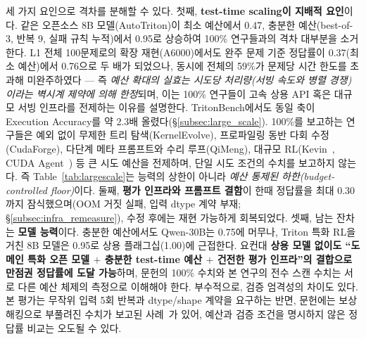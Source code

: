 \documentclass[sigplan,screen,review,anonymous]{acmart}
\begin{document}
\begin{table}[t]
\centering
\caption{동일 파이프라인에서 test-time 예산에 따른 Level~1 정답률. bo$N$=best-of-$N$, it$K$=반복 $K$회. 전수(100문제) 행은 Table~\ref{tab:largescale}, 정밀(P1--P20) 행은 \S\ref{subsec:infra_remeasure}·\S\ref{subsec:large_scale}의 측정이다. $^{\P}$완주한 38문제 기준(정답 29). 나머지 59문제는 문제당 시간 한도(2시간, 27회 시도 $\times$ 저속 서빙) 초과로 미완주 — 예산 확대의 실효가 벽시계 처리량에 의해 제약됨을 보여준다(총 22.9시간 소요).}
\label{tab:budget}
\end{table}

세 가지 요인으로 격차를 분해할 수 있다. 첫째, \textbf{test-time scaling이 지배적 요인}이다. 같은 오픈소스 8B 모델(AutoTriton)이 최소 예산에서 0.47, 충분한 예산(best-of-3, 반복 9, 실패 규칙 누적)에서 0.95로 상승하여 100\% 연구들과의 격차 대부분을 소거한다. L1 전체 100문제로의 확장 재현(A6000)에서도 완주 문제 기준 정답률이 0.37(최소 예산)에서 0.76으로 두 배가 되었으나, 동시에 전체의 59\%가 문제당 시간 한도를 초과해 미완주하였다 --- 즉 \emph{예산 확대의 실효는 시도당 처리량(서빙 속도와 병렬 경쟁)이라는 벽시계 제약에 의해 한정}되며, 이는 100\% 연구들이 고속 상용 API 혹은 대규모 서빙 인프라를 전제하는 이유를 설명한다. TritonBench에서도 동일 축이 Execution Accuracy를 약 2.3배 올렸다(\S\ref{subsec:large_scale}). 100\%를 보고하는 연구들은 예외 없이 무제한 트리 탐색(KernelEvolve), 프로파일링 동반 다회 수정(CudaForge), 다단계 메타 프롬프트와 수리 루프(QiMeng), 대규모 RL(Kevin~\cite{baronio2025kevin}, CUDA Agent~\cite{dai2026cudaagent}) 등 큰 시도 예산을 전제하며, 단일 시도 조건의 수치를 보고하지 않는다. 즉 Table~\ref{tab:largescale}는 능력의 상한이 아니라 \emph{예산 통제된 하한(budget-controlled floor)}이다. 둘째, \textbf{평가 인프라와 프롬프트 결함}이 한때 정답률을 최대 0.30까지 잠식했으며(OOM 거짓 실패, 입력 dtype 계약 부재; \S\ref{subsec:infra_remeasure}), 수정 후에는 재현 가능하게 회복되었다. 셋째, 남는 잔차는 \textbf{모델 능력}이다. 충분한 예산에서도 Qwen-30B는 0.75에 머무나, Triton 특화 RL을 거친 8B 모델은 0.95로 상용 플래그십(1.00)에 근접한다. 요컨대 \textbf{상용 모델 없이도 ``도메인 특화 오픈 모델 $+$ 충분한 test-time 예산 $+$ 건전한 평가 인프라''의 결합으로 만점권 정답률에 도달 가능}하며, 문헌의 100\% 수치와 본 연구의 전수 스캔 수치는 서로 다른 예산 체제의 측정으로 이해해야 한다. 부수적으로, 검증 엄격성의 차이도 있다. 본 평가는 무작위 입력 5회 반복과 dtype/shape 계약을 요구하는 반면, 문헌에는 보상 해킹으로 부풀려진 수치가 보고된 사례~\cite{lange2025aicudaengineer}가 있어, 예산과 검증 조건을 명시하지 않은 정답률 비교는 오도될 수 있다.
\end{document}
